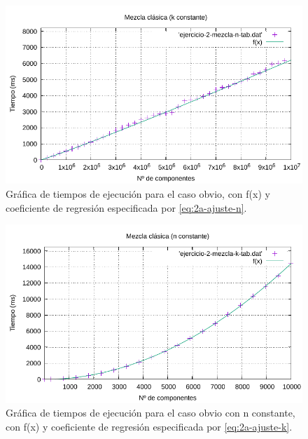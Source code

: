 \begin{figure}
    \centering
    \includegraphics[scale=0.76]{img/e2a-graph.pdf}
    \caption{Gráfica de tiempos de ejecución para el caso obvio, 
    con f(x) y coeficiente de regresión especificada por \ref{eq:2a-ajuste-n}.}
    \label{fig:2a-obvio-n-graph}
\end{figure}

\begin{figure}
	\centering
	\includegraphics[scale=0.76]{img/e2-obvio-k.pdf}
	\caption{Gráfica de tiempos de ejecución para el caso obvio con n constante, 
		con f(x) y coeficiente de regresión especificada por \ref{eq:2a-ajuste-k}.}
	\label{fig:2a-obvio-k-graph}
\end{figure}